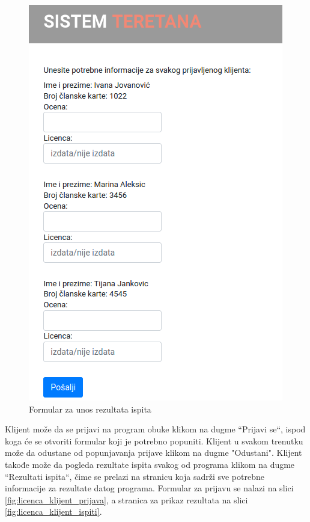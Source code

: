 \begin{figure}[!ht]
\begin{center}
\includegraphics[scale=0.45]{sections/korisnicki_interfejs/screenshots/licenca-admin-ispiti.png}
\end{center}
\caption{Formular za unos rezultata ispita}
\label{fig:admin_ispiti}
\end{figure}

Klijent može da se prijavi na program obuke klikom na dugme ``Prijavi se``, ispod koga će se otvoriti formular koji je potrebno popuniti. Klijent u svakom trenutku može da odustane od popunjavanja prijave klikom na dugme "Odustani". Klijent takođe može da pogleda rezultate ispita svakog od programa klikom na dugme ``Rezultati ispita``, čime se prelazi na stranicu koja sadrži sve potrebne informacije za rezultate datog programa. Formular za prijavu se nalazi na slici \ref{fig:licenca_klijent_prijava}, a stranica za prikaz rezultata na slici \ref{fig:licenca_klijent_ispiti}.

